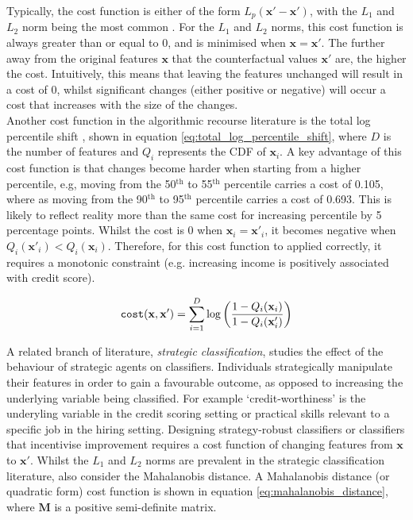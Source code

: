 Typically, the cost function is either of the form $L_p(\mathbf{x}'-\mathbf{x}')$, with the $L_1$ and $L_2$ norm being the most common \citep{ramakrishnanSynthesizingActionSequences2020, karimiSurveyAlgorithmicRecourse2022}. For the $L_1$ and $L_2$ norms, this cost function is always greater than or equal to 0, and is minimised when $\mathbf{x} =\mathbf{x}'$. The further away from the original features $\mathbf{x}$ that the counterfactual values $\mathbf{x}'$ are, the higher the cost. Intuitively, this means that leaving the features unchanged will result in a cost of 0, whilst significant changes (either positive or negative) will occur a cost that increases with the size of the changes.\\

Another cost function in the algorithmic recourse literature is the total log percentile shift \citep{ustunActionableRecourseLinear2019}, shown in equation \ref{eq:total_log_percentile_shift}, where $D$ is the number of features and $Q_i$ represents the CDF of $\mathbf{x}_i$. A key advantage of this cost function is that changes become harder when starting from a higher percentile, e.g, moving from the 50$^{\text{th}}$ to 55$^{\text{th}}$ percentile carries a cost of 0.105, where as moving from the 90$^{\text{th}}$ to 95$^{\text{th}}$ percentile carries a cost of 0.693. This is likely to reflect reality more than the same cost for increasing percentile by 5 percentage points. Whilst the cost is 0 when $\mathbf{x}_i = \mathbf{x}'_i$, it becomes negative when $Q_i(\mathbf{x}'_i) < Q_i(\mathbf{x}_i)$. Therefore, for this cost function to applied correctly, it requires a monotonic constraint (e.g. increasing income is positively associated with credit score).

\begin{equation} \label{eq:total_log_percentile_shift}
	\operatorname*{\texttt{cost}}(\mathbf{x}, \mathbf{x}') = \sum_{i=1}^D \log \bigg( \frac{1 - Q_i(\mathbf{x}_i)}{1 - Q_i(\mathbf{x}_i')} \bigg)
\end{equation}

A related branch of literature, \textit{strategic classification}, studies the effect of the behaviour of strategic agents on classifiers. Individuals strategically manipulate their features in order to gain a favourable outcome, as opposed to increasing the underlying variable being classified. For example `credit-worthiness' is the underyling variable in the credit scoring setting or practical skills relevant to a specific job in the hiring setting. Designing strategy-robust classifiers or classifiers that incentivise improvement requires a cost function of changing features from $\mathbf{x}$ to $\mathbf{x}'$. Whilst the  $L_1$ and $L_2$ norms are prevalent in the strategic classification literature, \textcite{bechavodInformationDiscrepancyStrategic2022} also consider the Mahalanobis distance. A Mahalanobis distance (or quadratic form) cost function is shown in equation \ref{eq:mahalanobis_distance}, where $\mathbf{M}$ is a positive semi-definite matrix. 

